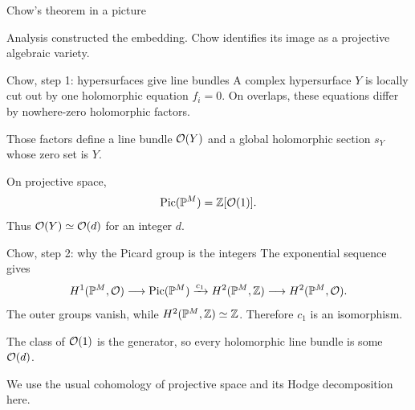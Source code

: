 \begin{frame}{Chow's theorem in a picture}
\begin{center}
\end{center}
\par\bigskip
Analysis constructed the embedding. Chow identifies its image as a projective algebraic variety.
\end{frame}

\begin{frame}{Chow, step 1: hypersurfaces give line bundles}
A complex hypersurface \(Y\) is locally cut out by one holomorphic equation \(f_i=0\).
On overlaps, these equations differ by nowhere-zero holomorphic factors.
\par\medskip
Those factors define a line bundle \(\mathcal O(Y)\) and a global holomorphic section \(s_Y\) whose zero set is \(Y\).
\par\medskip
On projective space,
\[
\operatorname{Pic}(\mathbb P^M)=\mathbb Z[\mathcal O(1)].
\]
Thus \(\mathcal O(Y)\simeq\mathcal O(d)\) for an integer \(d\).
\end{frame}

\begin{frame}{Chow, step 2: why the Picard group is the integers}
The exponential sequence gives
\[
H^1(\mathbb P^M,\mathcal O)\longrightarrow\operatorname{Pic}(\mathbb P^M)
\xrightarrow{c_1}H^2(\mathbb P^M,\mathbb Z)\longrightarrow H^2(\mathbb P^M,\mathcal O).
\]
The outer groups vanish, while \(H^2(\mathbb P^M,\mathbb Z)\simeq\mathbb Z\).
Therefore \(c_1\) is an isomorphism.
\par\medskip
The class of \(\mathcal O(1)\) is the generator, so every holomorphic line bundle is some \(\mathcal O(d)\).
\par\medskip
We use the usual cohomology of projective space and its Hodge decomposition here.
\end{frame}

